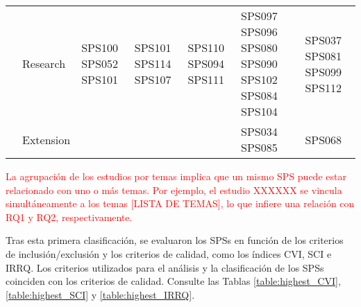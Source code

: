 \begin{table*}[htbp]
\begin{tabularx}{\textwidth}{p{0.8cm}p{2.5cm}>{\raggedright\arraybackslash}X>{\raggedright\arraybackslash}X>{\raggedright\arraybackslash}X>{\raggedright\arraybackslash}X>{\raggedright\arraybackslash}X}
		\addlinespace[0.3em]
		                                      & Research                & SPS100 SPS052 SPS101                                    & SPS101 SPS114 SPS107                                                                                                          & SPS110 SPS094 SPS111                                                                       & SPS097 SPS096 SPS080 SPS090 SPS102 SPS084 SPS104                                    & SPS037 SPS081 SPS099 SPS112        \\
		\addlinespace[0.3em]
		                                      & Extension               &                                                         &                                                                                                                               &                                                                                            & SPS034 SPS085                                                                       & SPS068                             \\
		\bottomrule
	\end{tabularx}
\end{table*}





\textcolor{red}{La agrupación de los estudios por temas implica que un mismo SPS puede estar relacionado con uno o más temas. Por ejemplo, el estudio XXXXXX se vincula simultáneamente a los temas [LISTA DE TEMAS], lo que infiere una relación con RQ1 y RQ2, respectivamente.}

Tras esta primera clasificación, se evaluaron los SPSs en función de los criterios de inclusión/exclusión y los criterios de calidad, como los índices CVI, SCI e IRRQ. Los criterios utilizados para el análisis y la clasificación de los SPSs coinciden con los criterios de calidad. Consulte las Tablas \ref{table:highest_CVI}, \ref{table:highest_SCI} y \ref{table:highest_IRRQ}.


